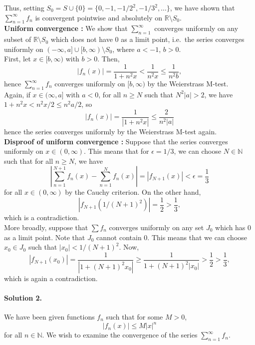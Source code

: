 \documentclass[10pt]{article}
\def\R{\mathbb{R}}
\def\N{\mathbb{N}}
\begin{document}
    Thus, setting $S_0 = S \cup \{0\} = \{0, -1, -1 /2^2, -1 /3^2, \dots\}$, we have
    shown that $\sum_{n = 1}^\infty f_n$ is convergent pointwise and absolutely on
    $\R \setminus S_0$. \\

    \textbf{Uniform convergence : } 
    We show that $\sum_{n = 1}^\infty$ converges uniformly on any subset of $\R
    \setminus S_0$ which does not have $0$ as a limit point, i.e.\ the series
    converges uniformly on $(-\infty, a] \cup [b, \infty) \setminus S_0$, where $a <
    -1$, $b > 0$. \\

    First, let $x \in [b, \infty)$ with $b > 0$. Then, \[
        |f_n(x)| = \frac{1}{1 + n^2x} < \frac{1}{n^2x} \leq \frac{1}{n^2b},
    \] hence $\sum_{n = 1}^\infty f_n$ converges uniformly on $[b, \infty)$ by the
    Weierstrass M-test. \\

    Again, if $x \in (\infty, a]$ with $a < 0$, for all $n \geq N$ such that $N^2|a|
    > 2$, we have $1 + n^2x < n^2 x/2 \leq n^2a / 2$, so \[
        |f_n(x)| = \frac{1}{|1 + n^2x|} \leq \frac{2}{n^2|a|}
    \] hence the series converges uniformly by the Weierstrass M-test again. \\
    
    \textbf{Disproof of uniform convergence : } Suppose that the series
    converges uniformly on $x \in (0, \infty)$. This means that for $\epsilon = 1
    /3$, we can choose $N \in \N$ such that for all $n \geq N$, we have \[
        \left|\sum_{n = 1}^{N + 1} f_{n}(x) - \sum_{n = 1}^{N}f_n(x) \right| = |f_{N
        + 1}(x)| < \epsilon = \frac{1}{3}
    \] for all $x \in (0, \infty)$ by the Cauchy criterion. 
    On the other hand, \[
        |f_{N + 1}(1 / (N + 1)^2)| = \frac{1}{2} > \frac{1}{3},
    \] which is a contradiction. \\

    More broadly, suppose that $\sum f_n$ converges uniformly on any set $J_0$ which
    has $0$ as a limit point. Note that $J_0$ cannot contain $0$. This means that we
    can choose $x_0 \in J_0$ such that $|x_0| < 1 /(N + 1)^2$. Now, \[
        |f_{N + 1}(x_0)| = \frac{1}{|1 + (N + 1)^2x_0|} \geq \frac{1}{1 + (N +
        1)^2|x_0|} >
        \frac{1}{2} > \frac{1}{3},
    \] which is again a contradiction. 


    \paragraph{Solution 2.} We have been given functions $f_n$ such that for some $M
    > 0$, \[
        |f_n(x)| \leq M|x|^n
    \] for all $n \in \N$. We wish to examine the convergence of the series $\sum_{n
    = 1}^\infty f_n$. \\
\end{document}
